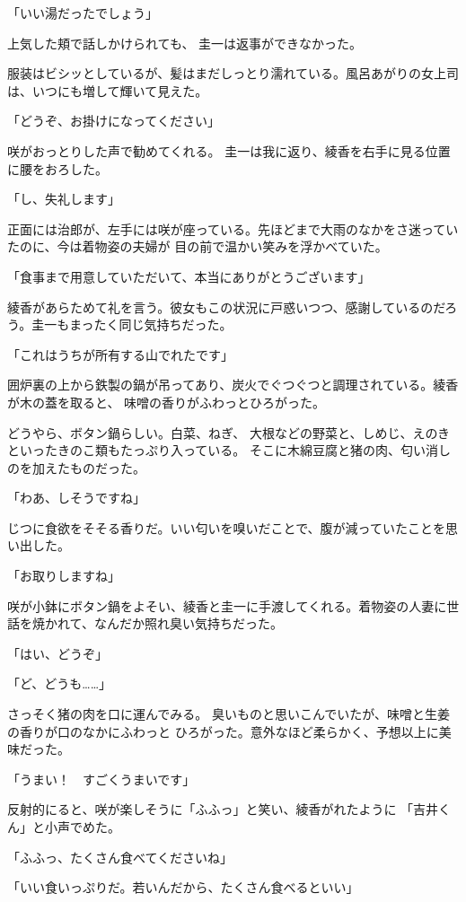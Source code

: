 ﻿\documentclass[
    book,tate,
    line_length=30zw,
    jafontsize=12pt,
    paper=b5j,
    landscape,
    ]{jlreq}
\begin{document}
「いい湯だったでしょう」

上気した頬で話しかけられても、 圭一は返事ができなかった。

服装はビシッとしているが、髪はまだしっとり濡れている。風呂あがりの女上司は、いつにも増して輝いて見えた。

「どうぞ、お掛けになってください」

咲がおっとりした声で勧めてくれる。 圭一は我に返り、綾香を右手に見る位置に腰をおろした。

「し、失礼します」

正面には治郎が、左手には咲が座っている。先ほどまで大雨のなかをさ迷っていたのに、今は着物姿の夫婦が
目の前で温かい笑みを浮かべていた。

「食事まで用意していただいて、本当にありがとうございます」

綾香があらためて礼を言う。彼女もこの状況に戸惑いつつ、感謝しているのだろう。圭一もまったく同じ気持ちだった。

「これはうちが所有する山でれたです」

囲炉裏の上から鉄製の鍋が吊ってあり、炭火でぐつぐつと調理されている。綾香が木の蓋を取ると、
味噌の香りがふわっとひろがった。

どうやら、ボタン鍋らしい。白菜、ねぎ、 大根などの野菜と、しめじ、えのきといったきのこ類もたっぷり入っている。
そこに木綿豆腐と猪の肉、匂い消しのを加えたものだった。

「わあ、しそうですね」

じつに食欲をそそる香りだ。いい匂いを嗅いだことで、腹が減っていたことを思い出した。

「お取りしますね」

咲が小鉢にボタン鍋をよそい、綾香と圭一に手渡してくれる。着物姿の人妻に世話を焼かれて、なんだか照れ臭い気持ちだった。

「はい、どうぞ」

「ど、どうも……」

さっそく猪の肉を口に運んでみる。 臭いものと思いこんでいたが、味噌と生姜の香りが口のなかにふわっと
ひろがった。意外なほど柔らかく、予想以上に美味だった。

「うまい！　すごくうまいです」

反射的にると、咲が楽しそうに「ふふっ」と笑い、綾香がれたように
「吉井くん」と小声でめた。

「ふふっ、たくさん食べてくださいね」

「いい食いっぷりだ。若いんだから、たくさん食べるといい」
\end{document}

